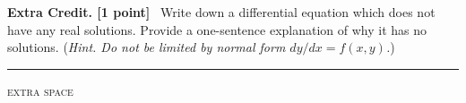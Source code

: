 \documentclass[12pt]{article}
\renewcommand{\emph}[1]{\textsf{\textbf{#1}}}
\begin{document}
\noindent \emph{Extra Credit. [1 point]} \, Write down a differential equation which does not have any real solutions.  Provide a one-sentence explanation of why it has no solutions.  (\textsl{Hint.  Do not be limited by normal form $dy/dx = f(x,y)$.})
\vspace{2.0in}

\clearpage\newpage
\noindent \hrule

\bigskip
\centerline{\footnotesize \textsc{extra space}}
\vfill
\end{document}
